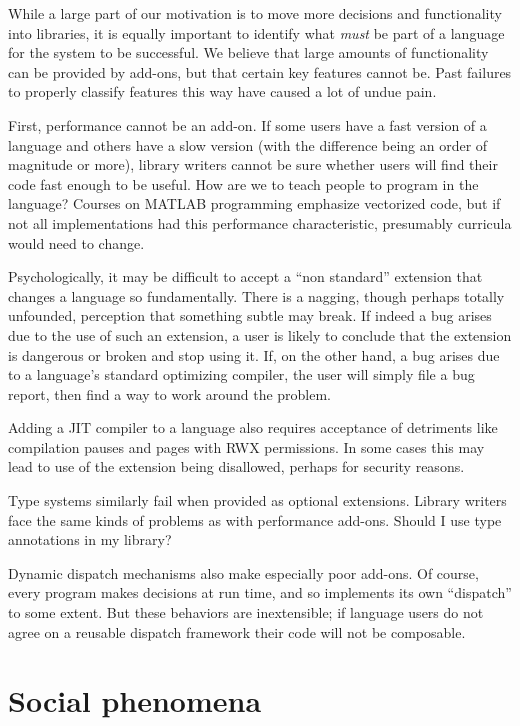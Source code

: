 {While a large part of our motivation is to move more decisions and functionality
into libraries, it is equally important to identify what {\it  must} be part of a
language for the system to be successful. We believe that large amounts of
functionality can be provided by add-ons, but that certain key features
cannot be. Past failures to properly classify features this way have
caused a lot of undue pain.

First, performance cannot be an add-on. If some users have a fast version of
a language and others have a slow version (with the difference being an
order of magnitude or more), library writers cannot be sure whether users
will find their code fast enough to be useful. How are we to teach people to
program in the language? Courses on MATLAB programming emphasize vectorized code,
but if not all implementations had this performance characteristic,
presumably curricula would need to change.

Psychologically, it may be difficult to accept a ``non standard'' extension
that changes a language so fundamentally. There is a nagging, though perhaps
totally unfounded, perception that something subtle may break. If indeed a
bug arises due to the use of such an extension, a user is likely to conclude
that the extension is dangerous or broken and stop using it. If, on the other
hand, a bug arises due to a language's standard optimizing compiler, the user
will simply file a bug report, then find a way to work around the problem.

Adding a JIT compiler to a language also requires acceptance of detriments
like compilation pauses and pages with RWX permissions. In some cases this
may lead to use of the extension being disallowed, perhaps for security
reasons.

Type systems similarly fail when provided as optional extensions. Library
writers face the same kinds of problems as with performance add-ons. Should I
use type annotations in my library?

Dynamic dispatch mechanisms also make especially poor add-ons. Of course,
every program makes decisions at run time, and so implements its own
``dispatch'' to some extent. But these behaviors are inextensible; if
language users do not agree on a reusable dispatch framework their code
will not be composable.


\section{Social phenomena}

}
